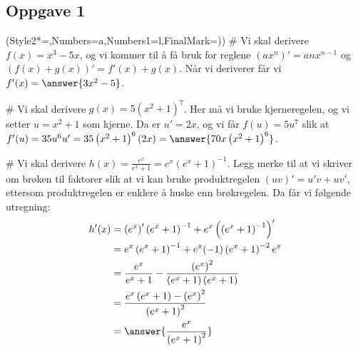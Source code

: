 \subsection*{Oppgave 1}
\begin{easylist}[enumerate]
	\ListProperties(Style2*=,Numbers=a,Numbers1=l,FinalMark={)})
	# Vi skal derivere $f(x) = x^3 - 5x$, og vi kommer til å få bruk for reglene $\left(ax^n\right)' = anx^{n-1}$ og $\left(f(x) + g(x)\right)' = f'(x) + g(x)$. 
	Når vi deriverer får vi $f'(x) = \answer{3x^2 - 5}$.
	
	# Vi skal derivere $g(x) = 5(x^2 + 1)^7$. 
	Her må vi bruke kjerneregelen, og vi setter $u = x^2 + 1$ som kjerne. Da er $u' = 2x$, og vi får $f(u) = 5u^7$ slik at $f'(u) = 35 u^6 u' = 35 \left(x^2 + 1\right)^6 \left(2x\right) = \answer{70x \left(x^2 + 1\right)^6}$.
	
	# Vi skal derivere $h(x) = \frac{e^x}{e^x + 1} = e^x \left(e^x + 1\right)^{-1}$.
	Legg merke til at vi skriver om brøken til faktorer slik at vi kan bruke produktregelen $(uv)' = u'v + uv'$, ettersom produktregelen er enklere å huske enn brøkregelen.
	Da får vi følgende utregning:
	\begin{align*}
	h'(x) &= \left( e^x \right)' \left(e^x + 1\right)^{-1} + e^x \left( \left(e^x + 1\right)^{-1} \right)' \\
	&= e^x \left(e^x + 1\right)^{-1} + e^x (-1) \left(e^x + 1\right)^{-2} e^x \\
	&= \frac{e^x}{e^x + 1} -\frac{\left(e^x\right)^2}{\left(e^x + 1\right) \left(e^x + 1\right)} \\
	&= \frac{e^x\left(e^x + 1\right) - \left(e^x\right)^2}{\left(e^x + 1\right)^2} \\
	&= \answer{\frac{e^x}{\left(e^x + 1\right)^2}}
	\end{align*}
\end{easylist}

